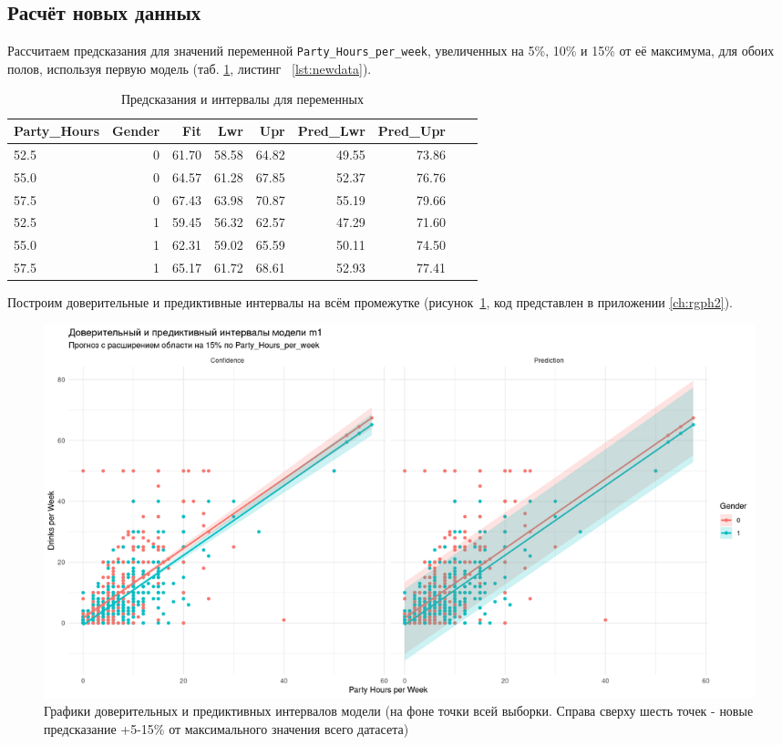 \subsection*{Расчёт новых данных}
Рассчитаем предсказания для значений переменной \texttt{Party\_Hours\_per\_week}, увеличенных на 5\%, 10\% и 15\% от её максимума, для обоих полов, используя первую модель (таб. \ref{tab:pred_intervals}, листинг~ \ref{lst:newdata}).



\begin{table}[ht]
	\centering
	\caption{Предсказания и интервалы для переменных}
	\begin{tabular}{|l|r|r|r|r|r|r|r|r|}
		\hline
		Party\_Hours & Gender & Fit & Lwr & Upr & Pred\_Lwr & Pred\_Upr \\
		\hline
		52.5 & 0 & 61.70 & 58.58 & 64.82 & 49.55 & 73.86 \\
		55.0 & 0 & 64.57 & 61.28 & 67.85 & 52.37 & 76.76 \\
		57.5 & 0 & 67.43 & 63.98 & 70.87 & 55.19 & 79.66 \\
		52.5 & 1 & 59.45 & 56.32 & 62.57 & 47.29 & 71.60 \\
		55.0 & 1 & 62.31 & 59.02 & 65.59 & 50.11 & 74.50 \\
		57.5 & 1 & 65.17 & 61.72 & 68.61 & 52.93 & 77.41 \\
		\hline
	\end{tabular}
	\label{tab:pred_intervals}
\end{table}

Построим доверительные и предиктивные интервалы\cite{wapnick2009} на всём промежутке (рисунок~\ref{fig:intervals}, код представлен в приложении \ref{ch:rgph2}).

\begin{figure}[h]
	\centering
	\includegraphics[height=0.6\textwidth]{imgs/intervals.png}
	\caption{Графики доверительных и предиктивных интервалов модели (на фоне точки всей выборки. Справа сверху шесть точек - новые предсказание +5-15\% от максимального значения всего датасета)}
	\label{fig:intervals}
\end{figure}

